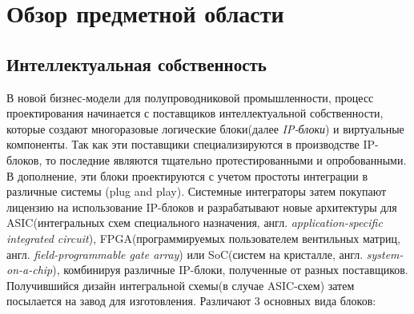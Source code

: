 \section{Обзор предметной области}
\label{sec:domain}


\subsection{Интеллектуальная собственность}
\label{sub:domain:ip}
В новой бизнес-модели для полупроводниковой промышленности, процесс проектирования начинается с поставщиков интеллектуальной собственности, которые создают многоразовые
логические блоки(далее \textit{IP-блоки}) и виртуальные компоненты. Так как эти поставщики специализируются в производстве IP-блоков, то последние являются тщательно протестированными и опробованными. В дополнение, эти блоки проектируются с учетом простоты интеграции в различные системы (plug and play). Системные интеграторы затем покупают лицензию на использование IP-блоков и разрабатывают новые архитектуры для ASIC(интегральных схем специального назначения, англ. \textit{application-specific integrated circuit}), FPGA(программируемых пользователем вентильных матриц, англ. \textit{field-programmable gate array}) или SoC(систем на кристалле, англ. \textit{system-on-a-chip}), комбинируя различные IP-блоки, полученные от разных поставщиков. Получившийся дизайн интегральной схемы(в случае ASIC-схем) затем посылается на завод для изготовления.
Различают 3 основных вида блоков\cite{conterfeit_integrated_circuits}:


